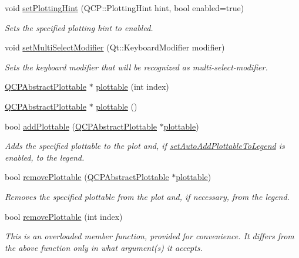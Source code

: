 \begin{DoxyCompactItemize}
void \hyperlink{a00116_a3b7c97bb6c16464e9e15190c07abe9a9}{set\+Plotting\+Hint} (Q\+C\+P\+::\+Plotting\+Hint hint, bool enabled=true)
\begin{DoxyCompactList}\small\item\em Sets the specified plotting {\itshape hint} to {\itshape enabled}. \end{DoxyCompactList}\item 
void \hyperlink{a00116_a8fc96e3b5138a06759a2a90c166df516}{set\+Multi\+Select\+Modifier} (Qt\+::\+Keyboard\+Modifier modifier)
\begin{DoxyCompactList}\small\item\em Sets the keyboard modifier that will be recognized as multi-\/select-\/modifier. \end{DoxyCompactList}\item 
\hyperlink{a00024}{Q\+C\+P\+Abstract\+Plottable} $\ast$ \hyperlink{a00116_a5c198d46ea2a2255a1b73e2c590f0364}{plottable} (int index)
\item 
\hyperlink{a00024}{Q\+C\+P\+Abstract\+Plottable} $\ast$ \hyperlink{a00116_afe26a6b79add0a11ae52f5700534ddb7}{plottable} ()
\item 
bool \hyperlink{a00116_ab7ad9174f701f9c6f64e378df77927a6}{add\+Plottable} (\hyperlink{a00024}{Q\+C\+P\+Abstract\+Plottable} $\ast$\hyperlink{a00116_afe26a6b79add0a11ae52f5700534ddb7}{plottable})
\begin{DoxyCompactList}\small\item\em Adds the specified plottable to the plot and, if \hyperlink{a00116_ad8858410c2db47b7104040a3aa61c3fc}{set\+Auto\+Add\+Plottable\+To\+Legend} is enabled, to the legend. \end{DoxyCompactList}\item 
bool \hyperlink{a00116_af3dafd56884208474f311d6226513ab2}{remove\+Plottable} (\hyperlink{a00024}{Q\+C\+P\+Abstract\+Plottable} $\ast$\hyperlink{a00116_afe26a6b79add0a11ae52f5700534ddb7}{plottable})
\begin{DoxyCompactList}\small\item\em Removes the specified plottable from the plot and, if necessary, from the legend. \end{DoxyCompactList}\item 
bool \hyperlink{a00116_afc210e0021480f8119bccf37839dbcc8}{remove\+Plottable} (int index)
\begin{DoxyCompactList}\small\item\em This is an overloaded member function, provided for convenience. It differs from the above function only in what argument(s) it accepts.


\end{DoxyCompactList}
\end{DoxyCompactItemize}
